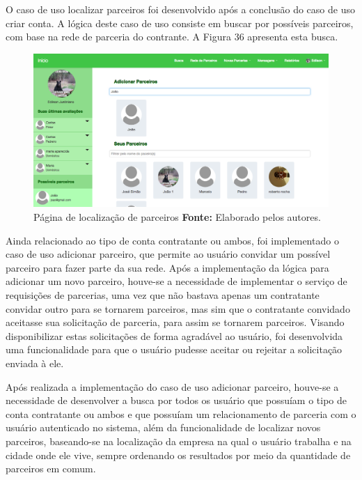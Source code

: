 \par O caso de uso localizar parceiros foi desenvolvido após a conclusão do caso de uso criar conta. A lógica deste caso de uso consiste em buscar por possíveis parceiros, com base na rede de parceria do contrante. A Figura 36 apresenta esta busca.

\begin{figure}[h!]
	\centerline{\includegraphics[scale=0.35]{./imagens/localizar-parceiro.png}}
	\caption[Página de localização de parceiros]
	{Página de localização de parceiros \textbf{Fonte:} Elaborado pelos autores.}
	\label{fig:exemplo1}
\end{figure}

\newpage



\par Ainda relacionado ao tipo de conta contratante ou ambos, foi implementado o caso de uso adicionar parceiro, que permite ao usuário convidar um possível parceiro para fazer parte da sua rede. Após a implementação da lógica para adicionar um novo parceiro, houve-se a necessidade de implementar o serviço de requisições de parcerias, uma vez que não bastava apenas um contratante convidar outro para se tornarem parceiros, mas sim que o contratante convidado aceitasse sua solicitação de parceria, para assim se tornarem parceiros. Visando disponibilizar estas solicitações de forma agradável ao usuário, foi desenvolvida uma funcionalidade para que o usuário pudesse aceitar ou rejeitar a solicitação enviada à ele.


\par Após realizada a implementação do caso de uso adicionar parceiro, houve-se a necessidade de desenvolver a busca por todos os usuário que possuíam o tipo de conta contratante ou ambos e que possuíam um relacionamento de parceria com o usuário autenticado no sistema, além da funcionalidade de localizar novos parceiros, baseando-se na localização da empresa na qual o usuário trabalha e na cidade onde ele vive, sempre ordenando os resultados por meio da quantidade de parceiros em comum. 

